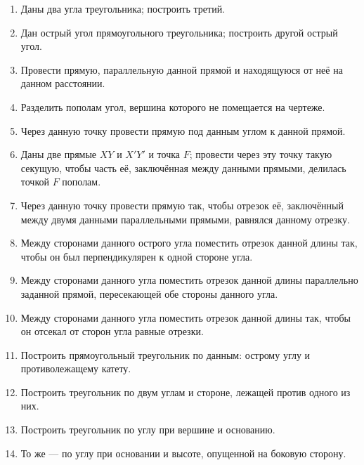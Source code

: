 \documentclass[twoside]{book}
\begin{document}
\begin{enumerate}[resume]

 \item
Даны два угла треугольника;
построить третий.

 \item
Дан острый угол прямоугольного треугольника;
построить другой острый угол.

 \item
Провести прямую, параллельную данной прямой и находящуюся от неё на данном расстоянии.

 \item
Разделить пополам угол, вершина которого не помещается на чертеже.

 \item
Через данную точку провести прямую под данным углом к данной прямой.

 \item
Даны две прямые $XY$ и $X'Y'$ и точка $F$;
провести через эту точку такую секущую, чтобы часть её, заключённая между данными прямыми, делилась точкой $F$ пополам.

 \item
Через данную точку провести прямую так, чтобы отрезок её, заключённый между двумя данными параллельными прямыми, равнялся данному отрезку.

 \item
Между сторонами данного острого угла поместить отрезок данной длины так, чтобы он был перпендикулярен к одной стороне угла.

 \item
Между сторонами данного угла поместить отрезок данной длины параллельно заданной прямой, пересекающей обе стороны данного угла.

 \item
Между сторонами данного угла поместить отрезок данной длины так, чтобы он отсекал от сторон угла равные отрезки.

 \item
Построить прямоугольный треугольник по данным:
острому углу и противолежащему катету.

 \item
Построить треугольник по двум углам и стороне, лежащей против одного из них.

 \item
Построить  треугольник по углу при вершине и основанию.

 \item
То же — по углу при основании и высоте, опущенной на боковую сторону.


\end{enumerate}
\end{document}
